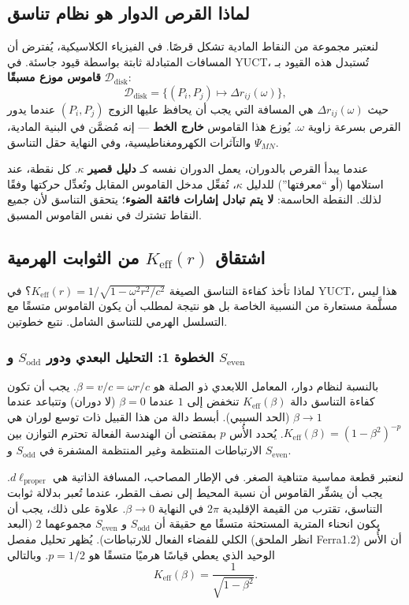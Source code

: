 \documentclass[12pt,a4paper]{article}
\newcommand{\Sodd}{S_{\mathrm{odd}}}
\newcommand{\Seven}{S_{\mathrm{even}}}
\begin{document}
	\subsection{لماذا القرص الدوار هو نظام تناسق}
	\label{subsec:disk-coordination}
	
	لنعتبر مجموعة من النقاط المادية تشكل قرصًا. في الفيزياء الكلاسيكية، يُفترض أن المسافات المتبادلة ثابتة بواسطة قيود جاسئة. في YUCT، تُستبدل هذه القيود بـ \textbf{قاموس موزع مسبقًا} \(\mathcal{D}_{\text{disk}}\):
	\[
	\mathcal{D}_{\text{disk}} = \bigl\{ (P_i, P_j) \mapsto \Delta r_{ij}(\omega) \bigr\},
	\]
	حيث \(\Delta r_{ij}(\omega)\) هي المسافة التي يجب أن يحافظ عليها الزوج \((P_i,P_j)\) عندما يدور القرص بسرعة زاوية \(\omega\). يُوزع هذا القاموس \textbf{خارج الخط} — إنه مُضمَّن في البنية المادية، والتآثرات الكهرومغناطيسية، وفي النهاية حقل التناسق \(\Psi_{MN}\).
	
	عندما يبدأ القرص بالدوران، يعمل الدوران نفسه كـ \textbf{دليل قصير} \(\kappa\). كل نقطة، عند استلامها (أو ``معرفتها'') للدليل \(\kappa\)، تُفعِّل مدخل القاموس المقابل وتُعدِّل حركتها وفقًا لذلك. النقطة الحاسمة: \textbf{لا يتم تبادل إشارات فائقة الضوء}؛ يتحقق التناسق لأن جميع النقاط تشترك في نفس القاموس المسبق.
	
	\subsection{اشتقاق \(K_{\mathrm{eff}}(r)\) من الثوابت الهرمية}
	\label{subsec:keff-derivation}
	
	لماذا تأخذ كفاءة التناسق الصيغة \(K_{\mathrm{eff}}(r) = 1/\sqrt{1-\omega^2 r^2/c^2}\)؟ في YUCT، هذا ليس مسلَّمة مستعارة من النسبية الخاصة بل هو نتيجة لمطلب أن يكون القاموس متسقًا مع التسلسل الهرمي للتناسق الشامل. نتبع خطوتين.
	
	\subsubsection{الخطوة 1: التحليل البعدي ودور \(\Sodd\) و \(\Seven\)}
	بالنسبة لنظام دوار، المعامل اللابعدي ذو الصلة هو \(\beta = v/c = \omega r/c\). يجب أن تكون كفاءة التناسق دالة \(K_{\mathrm{eff}}(\beta)\) تنخفض إلى \(1\) عندما \(\beta = 0\) (لا دوران) وتتباعد عندما \(\beta \to 1\) (الحد السببي). أبسط دالة من هذا القبيل ذات توسع لوران هي \(K_{\mathrm{eff}}(\beta) = (1-\beta^2)^{-p}\). يُحدد الأُس \(p\) بمقتضى أن الهندسة الفعالة تحترم التوازن بين الارتباطات المنتظمة وغير المنتظمة المشفرة في \(\Sodd\) و \(\Seven\).
	
	لنعتبر قطعة مماسية متناهية الصغر. في الإطار المصاحب، المسافة الذاتية هي \(d\ell_{\text{proper}}\). يجب أن يشفِّر القاموس أن نسبة المحيط إلى نصف القطر، عندما تُعبر بدلالة ثوابت التناسق، تقترب من القيمة الإقليدية \(2\pi\) في النهاية \(\beta \to 0\). علاوة على ذلك، يجب أن يكون انحناء المترية المستحثة متسقًا مع حقيقة أن \(\Sodd\) و \(\Seven\) مجموعهما \(2\) (البعد الكلي للفضاء الفعال للارتباطات). يُظهر تحليل مفصل (انظر الملحق Ferra1.2) أن الأُس الوحيد الذي يعطي قياسًا هرميًا متسقًا هو \(p = 1/2\). وبالتالي
	\[
	K_{\mathrm{eff}}(\beta) = \frac{1}{\sqrt{1-\beta^2}}.
	\]
	
\end{document}
